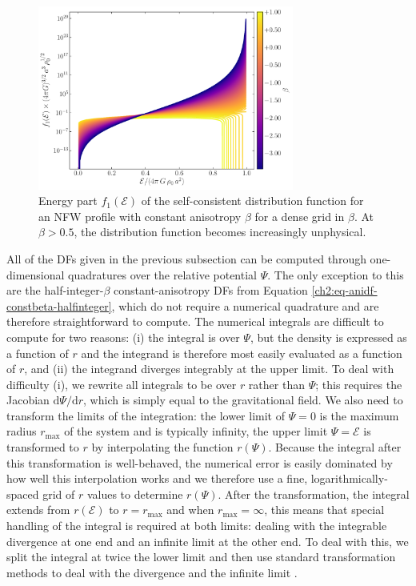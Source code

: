 \begin{figure}
	\centering
	\includegraphics[width=0.75\textwidth]{figure/ch2/constantbeta_nfw.pdf}
	\caption{Energy part $f_1(\mathcal{E})$ of the self-consistent distribution function for an NFW profile with constant anisotropy $\beta$ for a dense grid in $\beta$. At $\beta > 0.5$, the distribution function becomes increasingly unphysical.}
	\label{ch2:fig:constantbeta_nfw}
\end{figure}

All of the DFs given in the previous subsection can be computed through one-dimensional quadratures over the relative potential $\Psi$. The only exception to this are the half-integer-$\beta$ constant-anisotropy DFs from Equation \eqref{ch2:eq-anidf-constbeta-halfinteger}, which do not require a numerical quadrature and are therefore straightforward to compute. The numerical integrals are difficult to compute for two reasons: (i) the integral is over $\Psi$, but the density is expressed as a function of $r$ and the integrand is therefore most easily evaluated as a function of $r$, and (ii) the integrand diverges integrably at the upper limit. To deal with difficulty (i), we rewrite all integrals to be over $r$ rather than $\Psi$; this requires the Jacobian $\mathrm{d} \Psi / \mathrm{d} r$, which is simply equal to the gravitational field. We also need to transform the limits of the integration: the lower limit of $\Psi = 0$ is the maximum radius $r_{\mathrm{max}}$ of the system and is typically infinity, the upper limit $\Psi = \mathcal{E}$ is transformed to $r$ by interpolating the function $r(\Psi)$. Because the integral after this transformation is well-behaved, the numerical error is easily dominated by how well this interpolation works and we therefore use a fine, logarithmically-spaced grid of $r$ values to determine $r(\Psi)$. After the transformation, the integral extends from $r(\mathcal{E})$ to $r=r_{\mathrm{max}}$ and when $r_{\mathrm{max}}=\infty$, this means that special handling of the integral is required at both limits: dealing with the integrable divergence at one end and an infinite limit at the other end. To deal with this, we split the integral at twice the lower limit and then use standard transformation methods to deal with the divergence and the infinite limit \parencite[e.g.][]{press07}. 

